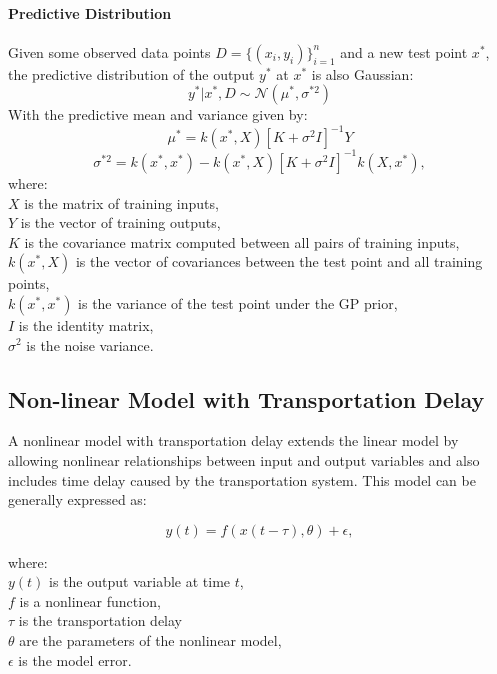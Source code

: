 \documentclass[12pt]{article}
\begin{document}
\\
\textbf{Predictive Distribution}\\
\\
Given some observed data points \( D = \{(x_i, y_i)\}_{i=1}^n \) and a new test
point \( x^* \), the predictive distribution of the output \( y^* \) at \( x^* \) is also
Gaussian:
\begin{equation}
    y^*|x^*, D \sim \mathcal{N}(\mu^*, \sigma^{*2})
\end{equation}
With the predictive mean and variance given by:\\
\begin{equation}
\mu^* = k(x^*, X) [K + \sigma^2I]^{-1} Y
\end{equation}
\begin{equation}
\sigma^{*2} = k(x^*, x^*) - k(x^*, X) [K + \sigma^2I]^{-1} k(X, x^*),
\end{equation}
where:\\
\( X \) is the matrix of training inputs,\\
\( Y \) is the vector of training outputs,\\
\( K \) is the covariance matrix computed between all pairs of training inputs,\\
\( k(x^*, X) \) is the vector of covariances between the test point and all training points,\\
\( k(x^*, x^*) \) is the variance of the test point under the GP prior,\\
\( I \) is the identity matrix,\\
\( \sigma^2 \) is the noise variance.

\subsection{Non-linear Model with Transportation Delay}

A nonlinear model with transportation delay extends the linear model by
allowing nonlinear relationships between input and output variables and
also includes time delay caused by the transportation system. This model
can be generally expressed as:

\begin{equation}
    y(t) = f(x(t - \tau), \theta) + \epsilon,
\end{equation}

\noindent where:\\
\( y(t) \) is the output variable at time \( t \),\\
\( f \) is a nonlinear function,\\
\( \tau \) is the transportation delay\\
\( \theta \) are the parameters of the nonlinear model,\\
\( \epsilon \) is the model error.\\
\end{document}
